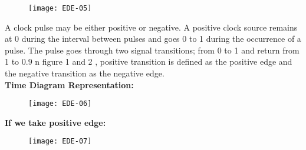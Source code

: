  \begin{figure}[H]
 	\centering
 	\texttt{[image: EDE-05]}
 \end{figure}
 A clock pulse may be either positive or negative. A positive clock source remains at 0 during the interval between pulses and goes 0 to 1 during the occurrence of a pulse. The pulse goes through two signal transitions; from 0 to 1 and return from 1 to $0.9$ n figure 1 and 2 , positive transition is defined as the positive edge and the negative transition as the negative edge.\\
 \textbf{Time Diagram Representation:}
 \begin{figure}[H]
 	\centering
 	\texttt{[image: EDE-06]}
 \end{figure}
 \textbf{If we take positive edge:}
 \begin{figure}[H]
 	\centering
 	\texttt{[image: EDE-07]}
 \end{figure}
